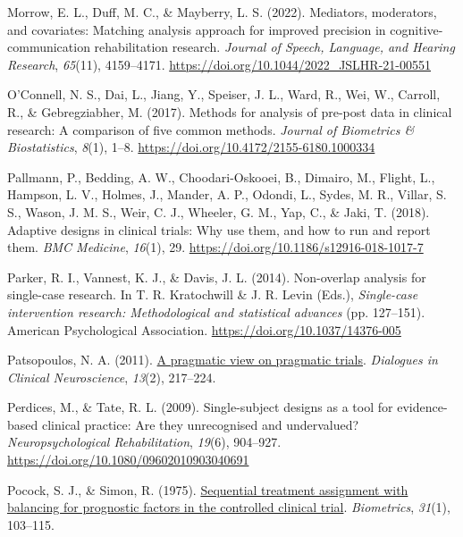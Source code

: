 \documentclass{krantz}
\newlength{\cslhangindent}
\newlength{\cslentryspacingunit} %
\newenvironment{CSLReferences}[2] %
{%
\setlength{\parindent}{0pt}
\ifodd #1
\let\oldpar\par
\def\par{\hangindent=\cslhangindent\oldpar}
\fi
\setlength{\parskip}{#2\cslentryspacingunit}
}%
{}
\begin{document}
\begin{CSLReferences}{1}{0}
\leavevmode{}%
Morrow, E. L., Duff, M. C., \& Mayberry, L. S. (2022). Mediators, moderators, and covariates: Matching analysis approach for improved precision in cognitive-communication rehabilitation research. \emph{Journal of Speech, Language, and Hearing Research}, \emph{65}(11), 4159--4171. \url{https://doi.org/10.1044/2022_JSLHR-21-00551}

\leavevmode{}%
O'Connell, N. S., Dai, L., Jiang, Y., Speiser, J. L., Ward, R., Wei, W., Carroll, R., \& Gebregziabher, M. (2017). Methods for analysis of pre-post data in clinical research: {A} comparison of five common methods. \emph{Journal of Biometrics \& Biostatistics}, \emph{8}(1), 1--8. \url{https://doi.org/10.4172/2155-6180.1000334}

\leavevmode{}%
Pallmann, P., Bedding, A. W., Choodari-Oskooei, B., Dimairo, M., Flight, L., Hampson, L. V., Holmes, J., Mander, A. P., Odondi, L., Sydes, M. R., Villar, S. S., Wason, J. M. S., Weir, C. J., Wheeler, G. M., Yap, C., \& Jaki, T. (2018). Adaptive designs in clinical trials: Why use them, and how to run and report them. \emph{BMC Medicine}, \emph{16}(1), 29. \url{https://doi.org/10.1186/s12916-018-1017-7}

\leavevmode{}%
Parker, R. I., Vannest, K. J., \& Davis, J. L. (2014). Non-overlap analysis for single-case research. In T. R. Kratochwill \& J. R. Levin (Eds.), \emph{Single-case intervention research: {Methodological} and statistical advances} (pp. 127--151). {American Psychological Association}. \url{https://doi.org/10.1037/14376-005}

\leavevmode{}%
Patsopoulos, N. A. (2011). \href{https://www.ncbi.nlm.nih.gov/pmc/articles/PMC3181997}{A pragmatic view on pragmatic trials}. \emph{Dialogues in Clinical Neuroscience}, \emph{13}(2), 217--224.

\leavevmode{}%
Perdices, M., \& Tate, R. L. (2009). Single-subject designs as a tool for evidence-based clinical practice: {Are} they unrecognised and undervalued? \emph{Neuropsychological Rehabilitation}, \emph{19}(6), 904--927. \url{https://doi.org/10.1080/09602010903040691}

\leavevmode{}%
Pocock, S. J., \& Simon, R. (1975). \href{https://www.ncbi.nlm.nih.gov/pubmed/1100130}{Sequential treatment assignment with balancing for prognostic factors in the controlled clinical trial}. \emph{Biometrics}, \emph{31}(1), 103--115.


\end{CSLReferences}
\end{document}
